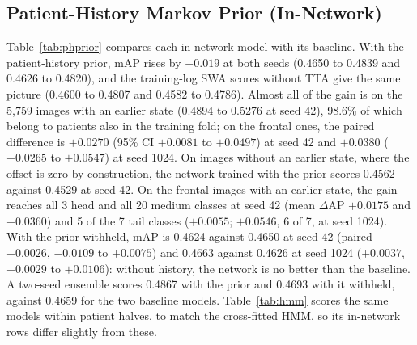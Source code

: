 \documentclass[conference]{IEEEtran}
\begin{document}
\subsection{Patient-History Markov Prior (In-Network)}
\label{sec:phres}
Table~\ref{tab:phprior} compares each in-network model with its baseline. With the patient-history prior, mAP rises by $+0.019$ at both seeds (0.4650 to 0.4839 and 0.4626 to 0.4820), and the training-log SWA scores without TTA give the same picture (0.4600 to 0.4807 and 0.4582 to 0.4786). Almost all of the gain is on the 5,759 images with an earlier state (0.4894 to 0.5276 at seed 42), 98.6\% of which belong to patients also in the training fold; on the frontal ones, the paired difference is $+0.0270$ (95\% CI $+0.0081$ to $+0.0497$) at seed 42 and $+0.0380$ ($+0.0265$ to $+0.0547$) at seed 1024. On images without an earlier state, where the offset is zero by construction, the network trained with the prior scores 0.4562 against 0.4529 at seed 42. On the frontal images with an earlier state, the gain reaches all 3 head and all 20 medium classes at seed 42 (mean $\Delta$AP $+0.0175$ and $+0.0360$) and 5 of the 7 tail classes ($+0.0055$; $+0.0546$, 6 of 7, at seed 1024). With the prior withheld, mAP is 0.4624 against 0.4650 at seed 42 (paired $-0.0026$, $-0.0109$ to $+0.0075$) and 0.4663 against 0.4626 at seed 1024 ($+0.0037$, $-0.0029$ to $+0.0106$): without history, the network is no better than the baseline. A two-seed ensemble scores 0.4867 with the prior and 0.4693 with it withheld, against 0.4659 for the two baseline models. Table~\ref{tab:hmm} scores the same models within patient halves, to match the cross-fitted HMM, so its in-network rows differ slightly from these.
\end{document}
